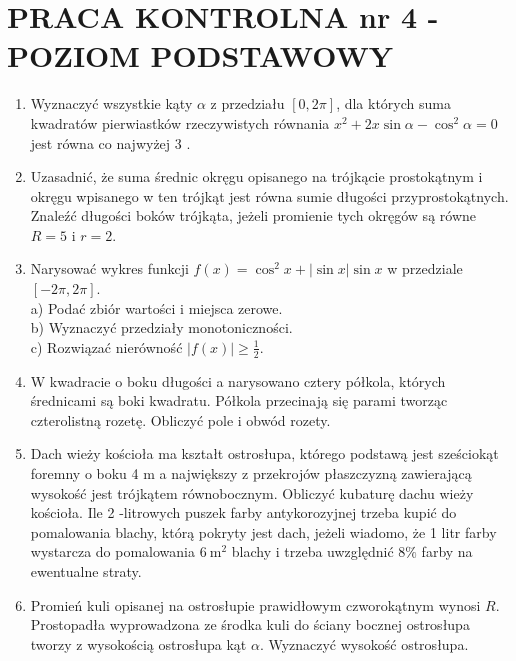 \documentclass[10pt]{article}
\begin{document}
\section*{PRACA KONTROLNA nr 4 - POZIOM PODSTAWOWY}
\begin{enumerate}
  \item Wyznaczyć wszystkie kąty $\alpha$ z przedziału $[0,2 \pi]$, dla których suma kwadratów pierwiastków rzeczywistych równania $x^{2}+2 x \sin \alpha-\cos ^{2} \alpha=0$ jest równa co najwyżej 3 .
  \item Uzasadnić, że suma średnic okręgu opisanego na trójkącie prostokątnym i okręgu wpisanego w ten trójkąt jest równa sumie długości przyprostokątnych. Znaleźć długości boków trójkąta, jeżeli promienie tych okręgów są równe $R=5$ i $r=2$.
  \item Narysować wykres funkcji $f(x)=\cos ^{2} x+|\sin x| \sin x$ w przedziale $[-2 \pi, 2 \pi]$.\\
a) Podać zbiór wartości i miejsca zerowe.\\
b) Wyznaczyć przedziały monotoniczności.\\
c) Rozwiązać nierówność $|f(x)| \geqslant \frac{1}{2}$.
  \item W kwadracie o boku długości a narysowano cztery półkola, których średnicami są boki kwadratu. Półkola przecinają się parami tworząc czterolistną rozetę. Obliczyć pole i obwód rozety.
  \item Dach wieży kościoła ma kształt ostrosłupa, którego podstawą jest sześciokąt foremny o boku 4 m a największy z przekrojów płaszczyzną zawierającą wysokość jest trójkątem równobocznym. Obliczyć kubaturę dachu wieży kościoła. Ile 2 -litrowych puszek farby antykorozyjnej trzeba kupić do pomalowania blachy, którą pokryty jest dach, jeżeli wiadomo, że 1 litr farby wystarcza do pomalowania $6 \mathrm{~m}^{2}$ blachy i trzeba uwzględnić $8 \%$ farby na ewentualne straty.
  \item Promień kuli opisanej na ostrosłupie prawidłowym czworokątnym wynosi $R$. Prostopadła wyprowadzona ze środka kuli do ściany bocznej ostrosłupa tworzy z wysokością ostrosłupa kąt $\alpha$. Wyznaczyć wysokość ostrosłupa.
\end{enumerate}
\end{document}
